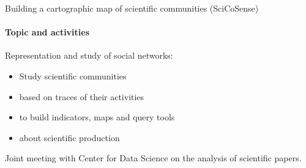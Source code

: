 \begin{frame}{Building a cartographic map of scientific communities (SciCoSense) }
  \framesubtitle{Topic and activities}
  Representation and study of social networks:
  \begin{itemize}
  \item Study scientific communities
  \item based on traces of their activities
  \item to build indicators, maps and query tools
  \item about scientific production
  \end{itemize}

  Joint meeting with Center for Data Science on the analysis of scientific papers.

\end{frame}

